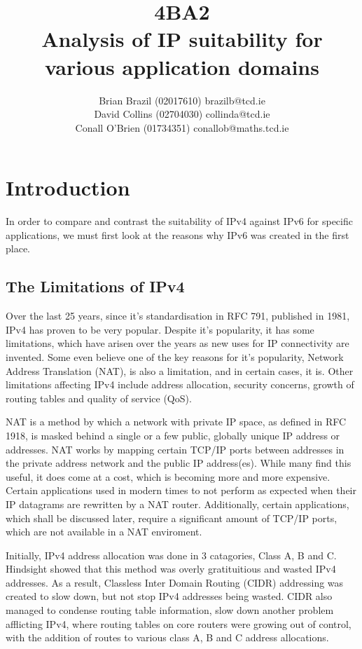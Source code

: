 \documentclass[a4paper,12pt]{article}
\begin{document}
\title{4BA2 \\ Analysis of IP suitability for various application domains}

\author{Brian Brazil (02017610) brazilb@tcd.ie \\
David Collins (02704030) collinda@tcd.ie \\ 
Conall O'Brien (01734351) conallob@maths.tcd.ie}

\maketitle

\section{Introduction}

In order to compare and contrast the suitability of IPv4 against IPv6
for specific applications, we must first look at the reasons why IPv6
was created in the first place.

\subsection{The Limitations of IPv4}

Over the last 25 years, since it's standardisation in RFC 791, published
in 1981, IPv4 has proven to be very popular. Despite it's popularity, it 
has some limitations, which have arisen over the years as new uses for 
IP connectivity are invented. Some even believe one of the key reasons
for it's popularity, Network Address Translation (NAT), is also a 
limitation, and in certain cases, it is. Other limitations
affecting IPv4 include address allocation, security concerns, growth of 
routing tables and quality of service (QoS).


NAT is a method by which a network with private IP space, as defined in
RFC 1918, is masked behind a single or a few public, globally unique IP
address or addresses. NAT works by mapping certain TCP/IP ports between
addresses in the private address network and the public IP address(es).
While many find this useful, it does come at a cost, which is becoming
more and more expensive. Certain applications used in modern times to
not perform as expected when their IP datagrams are rewritten by a NAT
router. Additionally, certain applications, which shall be discussed
later, require a significant amount of TCP/IP ports, which are not
available in a NAT enviroment.


Initially, IPv4 address allocation was done in 3 catagories, Class A, B
and C. Hindsight showed that this method was overly gratituitious and
wasted IPv4 addresses. As a result, Classless Inter Domain Routing
(CIDR) addressing was created to slow down, but not stop IPv4 addresses
being wasted. CIDR also managed to condense routing table information,
slow down another problem afflicting IPv4, where routing tables on core
routers were growing out of control, with the addition of routes to
various class A, B and C address allocations.
\end{document}
